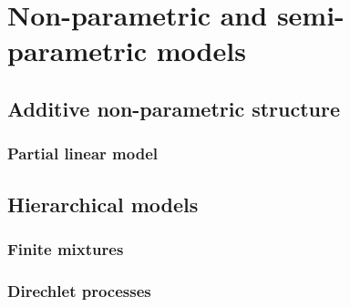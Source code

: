 \chapter{Non-parametric and semi-parametric models}\label{chap11}

\section{Additive non-parametric structure}\label{sec11_1}
\subsection{Partial linear model}\label{sec11_11}

\section{Hierarchical models}\label{sec11_2}
\subsection{Finite mixtures}\label{sec11_21}

\subsection{Direchlet processes}\label{sec11_22}